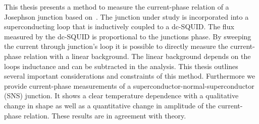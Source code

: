This thesis presents a method to measure the current-phase relation of a Josephson junction based on~\cite{frolovMeasurementCurrentPhaseRelation2004}. The junction under study is incorporated into a superconducting loop that is inductively coupled to a dc-SQUID. The flux measured by the dc-SQUID is proportional to the junctions phase. By sweeping the current through junction's loop it is possible to directly measure the current-phase relation with a linear background. The linear background depends on the loops inductance and can be subtracted in the analysis. This thesis outlines several important considerations and constraints of this method. Furthermore we provide current-phase measurements of a superconductor-normal-superconductor (SNS) junction. It shows a clear temperature dependence with a qualitative change in shape as well as a quantitative change in amplitude of the current-phase relation. These results are in agreement with theory.